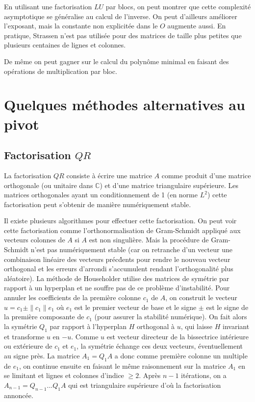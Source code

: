 \documentclass[a4paper,11pt]{book}
\begin{document}
\begin{giacjshere}
En utilisant une factorisation $LU$ par blocs, on peut montrer
que cette complexit\'e asymptotique se g\'en\'eralise au
calcul de l'inverse. On peut d'ailleurs am\'eliorer l'exposant,
mais la constante non explicit\'ee dans le $O$ augmente aussi.
En pratique, Strassen n'est pas utilis\'ee pour des matrices
de taille plus petites que plusieurs centaines de lignes et colonnes.

De m\^eme on peut gagner sur le calcul du polyn\^ome minimal en
faisant des op\'erations de multiplication par bloc.

\section{Quelques m\'ethodes alternatives au pivot}
\subsection{Factorisation $QR$}
La factorisation $QR$ 
consiste à écrire une matrice $A$ comme produit d'une matrice
orthogonale (ou unitaire dans $\mathbb{C}$) et d'une matrice triangulaire
supérieure. Les matrices orthogonales ayant un conditionnement
de 1 (en norme $L^2$) cette factorisation peut s'obtenir de mani\`ere 
numériquement stable.

Il existe plusieurs algorithmes pour effectuer cette factorisation.
On peut voir cette factorisation comme l'orthonormalisation de
Gram-Schmidt appliqu\'e aux vecteurs colonnes de $A$ si $A$ est non 
singuli\`ere. Mais la proc\'edure de Gram-Schmidt n'est pas
num\'eriquement stable (car on retranche d'un vecteur
une combinaison lin\'eaire des vecteurs pr\'ec\'dents pour rendre
le nouveau vecteur orthogonal et les erreurs d'arrondi s'accumulent
rendant l'orthogonalit\'e plus al\'eatoire).
La m\'ethode de Householder 
utilise des matrices de sym\'etrie
par rapport \`a un hyperplan et ne souffre pas de ce probl\`eme d'instabilit\'e.
Pour annuler les coefficients de la premi\`ere colonne $c_1$ de $A$,
on construit le vecteur $u=c_1 \pm \|c_1\| e_1$ o\`u $e_1$
est le premier vecteur de base et le signe $\pm$ est
le signe de la premi\`ere composante de $c_1$ (pour assurer
la stabilit\'e num\'erique). On fait alors la sym\'etrie $Q_1$ par rapport
\`a l'hyperplan $H$ orthogonal \`a $u$, qui laisse $H$ invariant
et transforme $u$ en $-u$. Comme $u$ est vecteur directeur
de la bissectrice int\'erieure ou ext\'erieure de $c_1$ et $e_1$, la sym\'etrie
\'echange ces deux vecteurs, \'eventuellement au signe pr\`es.
La matrice $A_1=Q_1A$ a donc comme premi\`ere colonne un multiple de
$e_1$, on continue ensuite en faisant le m\^eme raisonnement
sur la matrice $A_1$ en se limitant et lignes et colonnes d'indice
$\geq 2$. Apr\`es $n-1$ it\'erations, on a $A_{n-1}=Q_{n-1}...Q_1A$
qui est triangulaire sup\'erieure d'o\`u la factorisation annonc\'ee.


\end{giacjshere}
\end{document}
